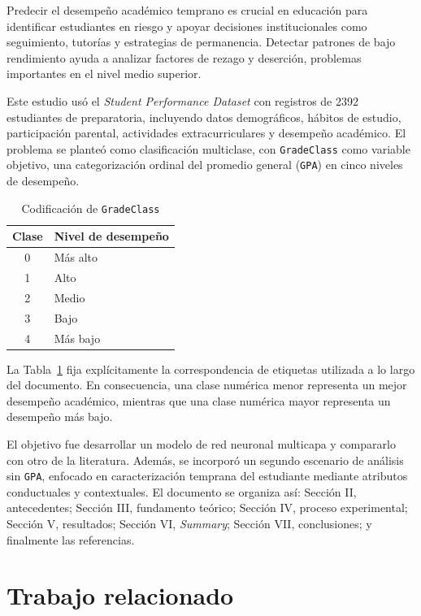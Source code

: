 \documentclass[conference]{IEEEtran}
\begin{document}
Predecir el desempeño académico temprano es crucial en educación para identificar estudiantes en riesgo y apoyar decisiones institucionales como seguimiento, tutorías y estrategias de permanencia. Detectar patrones de bajo rendimiento ayuda a analizar factores de rezago y deserción, problemas importantes en el nivel medio superior.

Este estudio usó el \textit{Student Performance Dataset} con registros de 2392 estudiantes de preparatoria, incluyendo datos demográficos, hábitos de estudio, participación parental, actividades extracurriculares y desempeño académico. El problema se planteó como clasificación multiclase, con \texttt{GradeClass} como variable objetivo, una categorización ordinal del promedio general (\texttt{GPA}) en cinco niveles de desempeño.

\begin{table}[htbp]
\centering
\caption{Codificación de \texttt{GradeClass}}
\scriptsize
\setlength{\tabcolsep}{6pt}
\begin{tabular}{cl}
\toprule
Clase & Nivel de desempeño \\
\midrule
0 & Más alto \\
1 & Alto \\
2 & Medio \\
3 & Bajo \\
4 & Más bajo \\
\bottomrule
\end{tabular}
\normalsize
\label{tab:gradeclass_mapping}
\end{table}

La Tabla~\ref{tab:gradeclass_mapping} fija explícitamente la correspondencia de etiquetas utilizada a lo largo del documento. En consecuencia, una clase numérica menor representa un mejor desempeño académico, mientras que una clase numérica mayor representa un desempeño más bajo.

El objetivo fue desarrollar un modelo de red neuronal multicapa y compararlo con otro de la literatura. Además, se incorporó un segundo escenario de análisis sin \texttt{GPA}, enfocado en caracterización temprana del estudiante mediante atributos conductuales y contextuales. El documento se organiza así: Sección II, antecedentes; Sección III, fundamento teórico; Sección IV, proceso experimental; Sección V, resultados; Sección VI, \textit{Summary}; Sección VII, conclusiones; y finalmente las referencias.

\section{Trabajo relacionado}\label{sec:relacionado}
\end{document}
